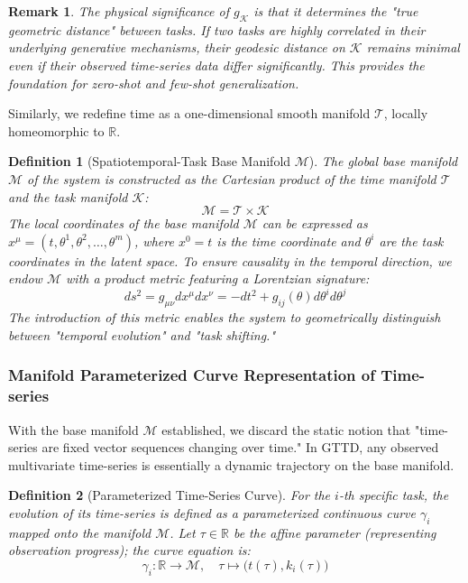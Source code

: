 \documentclass{article}
\newtheorem{definition}{Definition}[section]
\newtheorem{remark}{Remark}[section]
\begin{document}
\begin{remark}
The physical significance of $g_{\mathcal{K}}$ is that it determines the "true geometric distance" between tasks. If two tasks are highly correlated in their underlying generative mechanisms, their geodesic distance on $\mathcal{K}$ remains minimal even if their observed time-series data differ significantly. This provides the foundation for zero-shot and few-shot generalization.
\end{remark}

Similarly, we redefine time as a one-dimensional smooth manifold $\mathcal{T}$, locally homeomorphic to $\mathbb{R}$.

\begin{definition}[Spatiotemporal-Task Base Manifold $\mathcal{M}$]
The global base manifold $\mathcal{M}$ of the system is constructed as the Cartesian product of the time manifold $\mathcal{T}$ and the task manifold $\mathcal{K}$:
\begin{equation}
\mathcal{M} = \mathcal{T} \times \mathcal{K}
\end{equation}
The local coordinates of the base manifold $\mathcal{M}$ can be expressed as $x^\mu = (t, \theta^1, \theta^2, \dots, \theta^m)$, where $x^0 = t$ is the time coordinate and $\theta^i$ are the task coordinates in the latent space. To ensure causality in the temporal direction, we endow $\mathcal{M}$ with a product metric featuring a Lorentzian signature:
\begin{equation}
ds^2 = g_{\mu\nu} dx^\mu dx^\nu = -dt^2 + g_{ij}(\theta) d\theta^i d\theta^j
\end{equation}
The introduction of this metric enables the system to geometrically distinguish between "temporal evolution" and "task shifting."
\end{definition}

\subsubsection{Manifold Parameterized Curve Representation of Time-series}

With the base manifold $\mathcal{M}$ established, we discard the static notion that "time-series are fixed vector sequences changing over time." In GTTD, any observed multivariate time-series is essentially a dynamic trajectory on the base manifold.

\begin{definition}[Parameterized Time-Series Curve]
For the $i$-th specific task, the evolution of its time-series is defined as a parameterized continuous curve $\gamma_i$ mapped onto the manifold $\mathcal{M}$. Let $\tau \in \mathbb{R}$ be the affine parameter (representing observation progress); the curve equation is:
\begin{equation}
\gamma_i : \mathbb{R} \to \mathcal{M}, \quad \tau \mapsto \big( t(\tau), k_i(\tau) \big)
\end{equation}
\end{definition}
\end{document}
